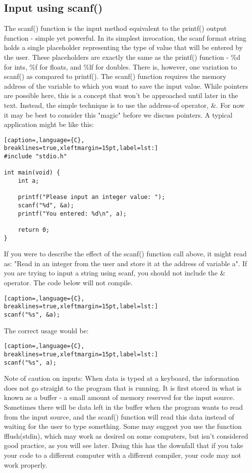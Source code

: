 \subsection{Input using scanf()}
The scanf() function is the input method equivalent to the printf() output
function - simple yet powerful. In its simplest invocation, the scanf format
string holds a single placeholder representing the type of value that will be
entered by the user. These placeholders are exactly the same as the printf()
function - \%d for ints, \%f for floats, and \%lf for doubles. There is, however,
one variation to scanf() as compared to printf(). The scanf() function requires
the memory address of the variable to which you want to save the input value.
While pointers are possible here, this is a concept that won't be approached
until later in the text. Instead, the simple technique is to use the address-of
operator, \&. For now it may be best to consider this "magic" before we discuss
pointers. A typical application might be like this:
\lstset{basicstyle=\scriptsize, numbers=left, captionpos=b, tabsize=4}
\begin{lstlisting}[caption=,language={C},
breaklines=true,xleftmargin=15pt,label=lst:]
#include "stdio.h"
 
int main(void) {
	int a;
	
	printf("Please input an integer value: ");
	scanf("%d", &a);
	printf("You entered: %d\n", a);
	
	return 0;
}
\end{lstlisting}

If you were to describe the effect of the scanf() function call above, it might
read as: "Read in an integer from the user and store it at the address of
variable a".  If you are trying to input a string using scanf, you should not
include the \& operator. The code below will not compile.
\lstset{basicstyle=\scriptsize, numbers=left, captionpos=b, tabsize=4}
\begin{lstlisting}[caption=,language={C},
breaklines=true,xleftmargin=15pt,label=lst:]
scanf("%s", &a);
\end{lstlisting}

The correct usage would be:
\lstset{basicstyle=\scriptsize, numbers=left, captionpos=b, tabsize=4}
\begin{lstlisting}[caption=,language={C},
breaklines=true,xleftmargin=15pt,label=lst:]
scanf("%s", a);
\end{lstlisting}
Note of caution on inputs: When data is typed at a keyboard, the information
does not go straight to the program that is running. It is first stored in what
is known as a buffer - a small amount of memory reserved for the input source.
Sometimes there will be data left in the buffer when the program wants to read
from the input source, and the scanf() function will read this data instead of
waiting for the user to type something. Some may suggest you use the function
fflush(stdin), which may work as desired on some computers, but isn't
considered good practice, as you will see later. Doing this has the downfall
that if you take your code to a different computer with a different compiler,
your code may not work properly.
